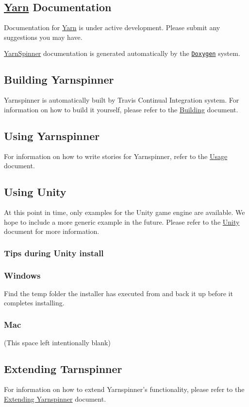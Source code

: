 \subsection*{\hyperlink{a00031}{Yarn} Documentation}

Documentation for \hyperlink{a00031}{Yarn} is under active development. Please submit any suggestions you may have.

\hyperlink{a00313}{Yarn\-Spinner} documentation is generated automatically by the \href{http://www.doxygen.org}{\tt Doxygen} system.

\subsection*{Building Yarnspinner}

Yarnspinner is automatically built by Travis Continual Integration system. For information on how to build it yourself, please refer to the \hyperlink{a00175}{Building} document.

\subsection*{Using Yarnspinner}

For information on how to write stories for Yarnspinner, refer to the \hyperlink{a00180}{Usage} document.

\subsection*{Using Unity}

At this point in time, only examples for the Unity game engine are available. We hope to include a more generic example in the future. Please refer to the \hyperlink{a00179}{Unity} document for more information.

\subsubsection*{Tips during Unity install}

\subsubsection*{Windows}

Find the temp folder the installer has executed from and back it up before it completes installing.

\subsubsection*{Mac}

(This space left intentionally blank)

\subsection*{Extending Tarnspinner}

For information on how to extend Yarnspinner's functionality, please refer to the \hyperlink{a00176}{Extending Yarnspinner} document. 